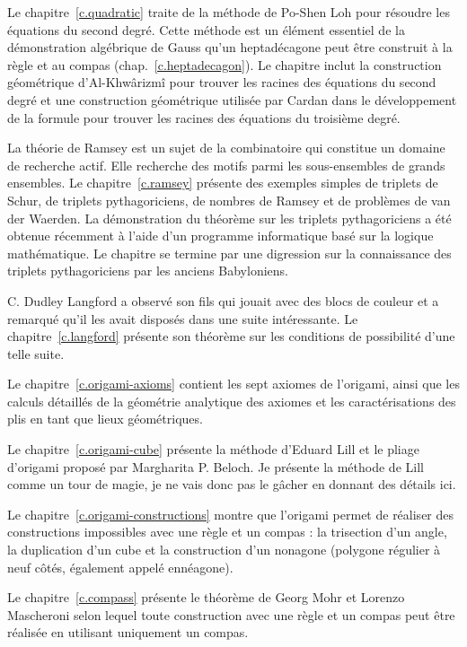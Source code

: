 Le chapitre~\ref{c.quadratic} traite de la méthode de Po-Shen Loh pour résoudre les équations du second degré. Cette méthode est un élément essentiel de la démonstration algébrique de Gauss qu'un heptadécagone peut être construit à la règle et au compas (chap.~\ref{c.heptadecagon}). Le chapitre inclut la construction géométrique d'Al-Khwârizmî pour trouver les racines des équations du second degré et une construction géométrique utilisée par Cardan dans le développement de la formule pour trouver les racines des équations du troisième degré.

La théorie de Ramsey est un sujet de la combinatoire qui constitue un domaine de recherche actif. Elle recherche des motifs parmi les sous-ensembles de grands ensembles. Le chapitre~\ref{c.ramsey} présente des exemples simples de triplets de Schur, de triplets pythagoriciens, de nombres de Ramsey et de problèmes de van der Waerden. La démonstration du théorème sur les triplets pythagoriciens a été obtenue récemment à l'aide d'un programme informatique basé sur la logique mathématique. Le chapitre se termine par une digression sur la connaissance des triplets pythagoriciens par les anciens Babyloniens.

C. Dudley Langford a observé son fils qui jouait avec des blocs de couleur et a remarqué qu'il les avait disposés dans une suite intéressante. Le chapitre~\ref{c.langford} présente son théorème sur les conditions de possibilité d'une telle suite.

Le chapitre~\ref{c.origami-axioms} contient les sept axiomes de l'origami, ainsi que les calculs détaillés de la géométrie analytique des axiomes et les caractérisations des plis en tant que lieux géométriques.

Le chapitre~\ref{c.origami-cube} présente la méthode d'Eduard Lill et le pliage d'origami proposé par Margharita P. Beloch. Je présente la méthode de Lill comme un tour de magie, je ne vais donc pas le gâcher en donnant des détails ici.

Le chapitre~\ref{c.origami-constructions} montre que l'origami permet de réaliser des constructions impossibles avec une règle et un compas : la trisection d'un angle, la duplication d'un cube et la construction d'un nonagone (polygone régulier à neuf côtés, également appelé ennéagone).

Le chapitre~\ref{c.compass} présente le théorème de Georg Mohr et Lorenzo Mascheroni selon lequel toute construction avec une règle et un compas peut être réalisée en utilisant uniquement un compas.

